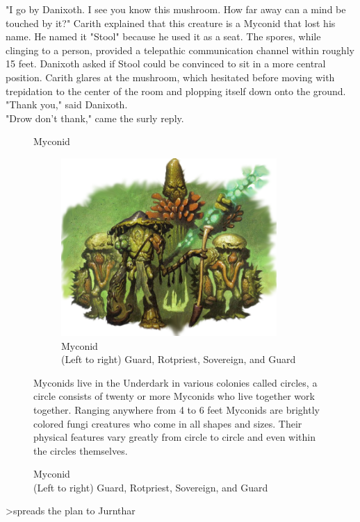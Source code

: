 \documentclass[letterpaper,10pt,twoside,twocolumn,openany]{book}
\begin{document}
"I go by Danixoth. I see you know this mushroom. How far away can a mind be touched by it?" Carith explained that this creature is a Myconid that lost his name. He named it "Stool" because he used it as a seat. The spores, while clinging to a person, provided a telepathic communication channel within roughly 15 feet. Danixoth asked if Stool could be convinced to sit in a more central position. Carith glares at the mushroom, which hesitated before moving with trepidation to the center of the room and plopping itself down onto the ground.\\
"Thank you," said Danixoth.\\
"Drow don't thank," came the surly reply.
\begin{figure}[h]
	\begin{paperbox}{Myconid}
		\begin{figure}[H]
			\centering
			\includegraphics[width=0.9\textwidth]{img/dist/myconid.png}
			\caption{Myconid\\{\tiny(Left to right) Guard, Rotpriest, Sovereign, and Guard}\label{fig:myconid}}
		\end{figure}
		Myconids live in the Underdark in various colonies called circles, a circle consists of twenty or more Myconids who live together work together. Ranging anywhere from 4 to 6 feet Myconids are brightly colored fungi creatures who come in all shapes and sizes. Their physical features vary greatly from circle to circle and even within the circles themselves.
	\end{paperbox}
\end{figure}

>spreads the plan to Jurnthar
\end{document}

